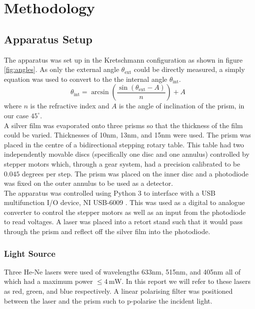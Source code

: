 \documentclass[%
reprint,
amsmath,amssymb,
aps,
]{revtex4-2}
\begin{document}
	\section{Methodology}
		\subsection{Apparatus Setup}
			The apparatus was set up in the Kretschmann configuration as shown in figure \ref{fig:angles}. As only the external angle $\theta_\text{ext}$ could be directly measured, a simply equation was used to convert to the the internal angle $\theta_\text{int}$.
			\begin{equation}
				\theta_\text{int} = \arcsin{\left( \frac{\sin{\left(\theta_\text{ext}-A\right)}}{n} \right)} + A
			\end{equation}where $n$ is the refractive index and $A$ is the angle of inclination of the prism, in our case $45^\circ$. \\
		
			A silver film was evaporated onto three prisms so that the thickness of the film could be varied. Thicknesses of 10nm, 13nm, and 15nm were used. The prism was placed in the centre of a bidirectional stepping rotary table. This table had two independently movable discs (specifically one disc and one annulus) controlled by stepper motors which, through a gear system, had a precision calibrated to be $0.045$ degrees per step. The prism was placed on the inner disc and a photodiode was fixed on the outer annulus to be used as a detector.\\
			
			The apparatus was controlled using Python 3 to interface with a USB multifunction I/O device, NI USB-6009 \cite{nationalInstruments}. This was used as a digital to analogue converter to control the stepper motors as well as an input from the photodiode to read voltages. A laser was placed into a retort stand such that it would pass through the prism and reflect off the silver film into the photodiode.

			\subsubsection{Light Source}
				Three He-Ne lasers were used of wavelengths 633nm, 515nm, and 405nm all of which had a maximum power $\le 4 \,\text{mW}$. In this report we will refer to these lasers as red, green, and blue respectively. A linear polarising filter was positioned between the laser and the prism such to p-polarise the incident light.
			
\end{document}
